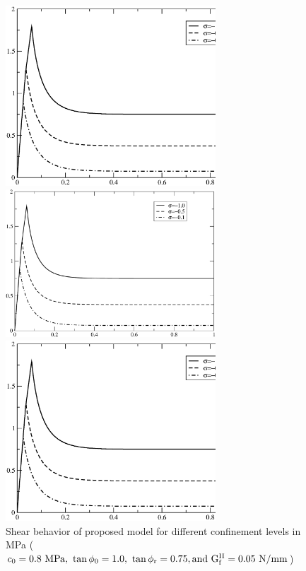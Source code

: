 \documentclass[a4paper]{article}
\begin{document}
\begin{figure}[!htb]
\begin{htmlonly}
  \centerline{\includegraphics[width=0.7\textwidth]{shearconf.eps}}
\end{htmlonly}
\ifpdf
 \centerline{\includegraphics[width=0.7\textwidth]{shearconf.pdf}}
\else
 \centerline{\includegraphics[width=0.7\textwidth]{shearconf.eps}}
\fi
  \caption{Shear behavior of proposed model for different confinement levels in MPa ($c_0=0.8\ \rm{MPa},\ \tan\phi_0=1.0,\ \tan\phi_r=0.75,{\rm and}\ G_f^{II}=0.05\ {N/mm}$)}
\end{figure}
\end{document}
